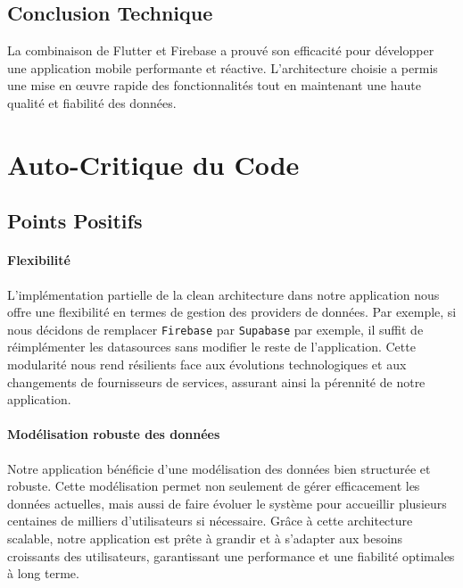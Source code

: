 \subsection{Conclusion Technique}

La combinaison de Flutter et Firebase a prouvé son efficacité pour développer une application mobile performante et réactive. L'architecture choisie a permis une mise en œuvre rapide des fonctionnalités tout en maintenant une haute qualité et fiabilité des données.

\section{Auto-Critique du Code}

\subsection{Points Positifs}

\paragraph{Flexibilité}
L'implémentation partielle de la clean architecture dans notre application nous offre une flexibilité en termes de gestion des providers de données. Par exemple, si nous décidons de remplacer \texttt{Firebase} par \texttt{Supabase} par exemple, il suffit de réimplémenter les datasources sans modifier le reste de l'application. Cette modularité nous rend résilients face aux évolutions technologiques et aux changements de fournisseurs de services, assurant ainsi la pérennité de notre application.

\paragraph{Modélisation robuste des données}
Notre application bénéficie d'une modélisation des données bien structurée et robuste. Cette modélisation permet non seulement de gérer efficacement les données actuelles, mais aussi de faire évoluer le système pour accueillir plusieurs centaines de milliers d'utilisateurs si nécessaire. Grâce à cette architecture scalable, notre application est prête à grandir et à s'adapter aux besoins croissants des utilisateurs, garantissant une performance et une fiabilité optimales à long terme.

